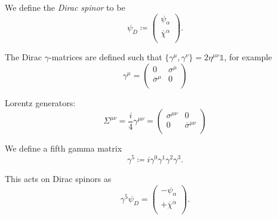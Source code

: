\begin{definition}
  We define the \emph{Dirac spinor} to be
  \begin{equation}
    \psi_D \coloneqq 
    \begin{pmatrix}
    \psi_{\alpha} \\
    \overline{\chi}{}^{\dot\alpha} \\
    \end{pmatrix}.
  \end{equation}
\end{definition}
\begin{definition}
  The Dirac $\gamma$-matrices are defined such that $\{\gamma^{\mu}, \gamma^{\nu}\} = 2 \eta^{\mu\nu} \mathbb{1}$, for example
  \begin{equation}
    \gamma^{\mu} = 
    \begin{pmatrix}
     0 & \sigma^{\mu} \\
     \overline{\sigma}{}^{\mu} & 0 \\
    \end{pmatrix}
  \end{equation}
\end{definition}
Lorentz generators:
\begin{equation}
  \Sigma^{\mu\nu} = \frac{i}{4}\gamma^{\mu\nu} = 
  \begin{pmatrix}
   \sigma^{\mu\nu} & 0 \\
   0 & \overline{\sigma}{}^{\mu\nu} \\
  \end{pmatrix}
\end{equation}
\begin{definition}
  We define a fifth gamma matrix
  \begin{equation}
    \gamma^5 \coloneqq i \gamma^0 \gamma^1 \gamma^2 \gamma^3.
  \end{equation}
\end{definition}
\begin{claim}
  This acts on Dirac spinors as
  \begin{equation}
    \gamma^5 \psi_D = 
    \begin{pmatrix}
    -\psi_{\alpha} \\
    +\overline{\chi}{}^{\dot\alpha} \\
    \end{pmatrix}.
  \end{equation}
\end{claim}

